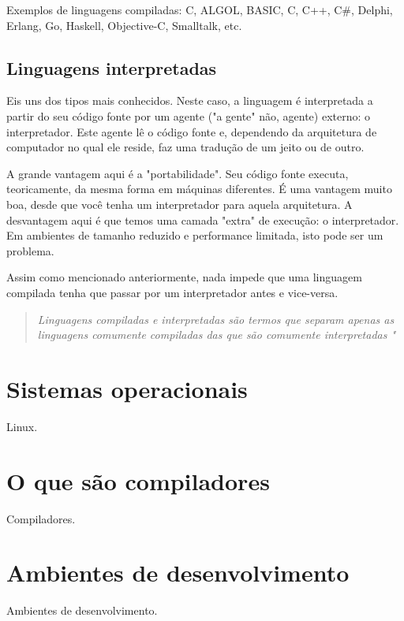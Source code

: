Exemplos de linguagens compiladas: C, ALGOL, BASIC, C, C++, C#, Delphi, Erlang, Go, Haskell, Objective-C, Smalltalk, etc.

\subsection{Linguagens interpretadas}

Eis uns dos tipos mais conhecidos. Neste caso, a linguagem é interpretada a partir do seu código fonte por um agente ("a gente" não, agente) externo: o interpretador. Este agente lê o código fonte e, dependendo da arquitetura de computador no qual ele reside, faz uma tradução de um jeito ou de outro.

A grande vantagem aqui é a "portabilidade". Seu código fonte executa, teoricamente, da mesma forma em máquinas diferentes. É uma vantagem muito boa, desde que você tenha um interpretador para aquela arquitetura. A desvantagem aqui é que temos uma camada "extra" de execução: o interpretador. Em ambientes de tamanho reduzido e performance limitada, isto pode ser um problema.

Assim como mencionado anteriormente, nada impede que uma linguagem compilada tenha que passar por um interpretador antes e vice-versa.

\begin{quotation}
\textit{{\Large Linguagens compiladas e interpretadas são termos que separam apenas as linguagens comumente compiladas das que são comumente interpretadas	"}}
\end{quotation}


\section{Sistemas operacionais}

Linux.


\section{O que são compiladores}

Compiladores.


\section{Ambientes de desenvolvimento}

Ambientes de desenvolvimento.


